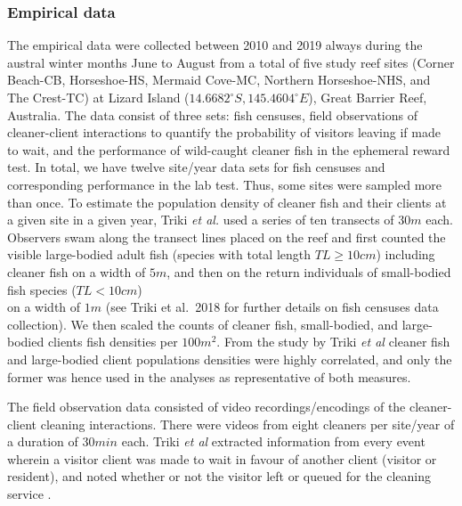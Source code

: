 \documentclass[]{rsos}%
\begin{document}
\hypertarget{empirical-data}{%
\subsubsection{Empirical data}\label{empirical-data}}

The empirical data were collected between 2010 and 2019 always during
the austral winter months June to August from a total of five
study reef sites (Corner Beach-CB, Horseshoe-HS, Mermaid Cove-MC,
Northern Horseshoe-NHS, and The Crest-TC) at Lizard Island
(\(14.6682^\circ S, 145.4604^\circ E\)), Great Barrier Reef, Australia.
The data consist of three sets: fish censuses, field
observations of cleaner-client interactions to quantify the probability
of visitors leaving if made to wait, and the
performance of wild-caught cleaner fish in the ephemeral reward test.
In total, we have twelve site/year data sets for fish censuses and
corresponding performance in the lab test. Thus, some sites were sampled more
than once. To estimate the population density of cleaner fish
and their clients at a given site in
a given year, Triki \emph{et al.} \citep{triki_Biological_2019} used a series of ten
transects of \(30m\) each. Observers swam along the transect lines placed on
the reef and first counted the visible large-bodied adult fish
(species with total length \(TL \geq 10cm\)) including cleaner fish
on a width of \(5m\), and then on the
return individuals of small-bodied fish species (\(TL < 10 cm\))\\
on a width of \(1 m\)
(see Triki et al.~2018 for further details on fish censuses data collection).
We then scaled the counts of cleaner fish, small-bodied,
and large-bodied clients fish densities per \(100 m^2\).
From the study by Triki \emph{et al} \citep{triki_Biological_2019}
cleaner fish and large-bodied client populations densities were
highly correlated, and only the former
was hence used in the analyses as representative of both measures.

The field observation data consisted of video recordings/encodings of the
cleaner-client cleaning interactions. There were videos from eight
cleaners per site/year of a duration of \(30 min\) each. Triki \emph{et al}
extracted information from every event wherein a visitor client
was made to wait in favour of another client (visitor or resident), and noted
whether or not the visitor left or queued for the cleaning service
\citep{triki_Biological_2019, triki_Brain_2020}.
\end{document}

